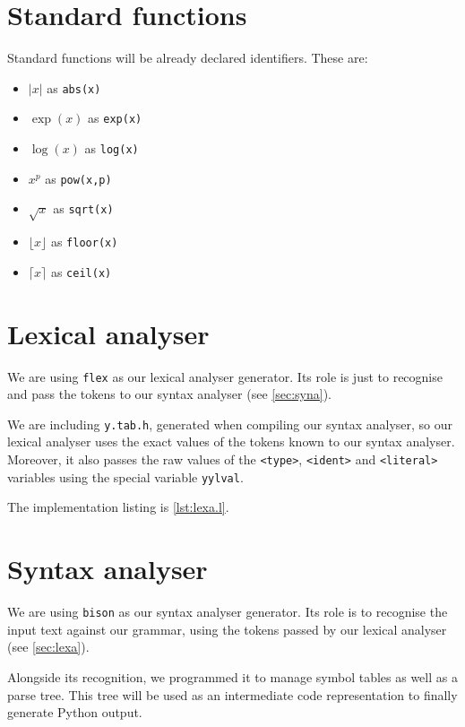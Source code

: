 \documentclass[a4paper,12pt,notitlepage,english]{article}
\begin{document}
  \section{Standard functions}\label{sec:std}

  Standard functions will be already declared identifiers.
  These are:\begin{itemize}
    \item \(|x|\) as \verb+abs(x)+
    \item \(\exp(x)\) as \verb+exp(x)+
    \item \(\log(x)\) as \verb+log(x)+
    \item \(x^p\) as \verb+pow(x,p)+
    \item \(\sqrt{x}\) as \verb+sqrt(x)+
    \item \(\lfloor x \rfloor\) as \verb+floor(x)+
    \item \(\lceil x \rceil\) as \verb+ceil(x)+
  \end{itemize}

  \section{Lexical analyser}\label{sec:lexa}

  We are using \texttt{flex} as our lexical analyser generator.
  Its role is just to recognise and pass the tokens to our syntax analyser (see \autoref{sec:syna}).

  We are including \texttt{y.tab.h}, generated when compiling our syntax analyser, so our lexical analyser uses the exact values of the tokens known to our syntax analyser.
  Moreover, it also passes the raw values of the \verb+<type>+, \verb+<ident>+ and \verb+<literal>+ variables using the special variable \texttt{yylval}.

  The implementation listing is \autoref{lst:lexa.l}.

  \section{Syntax analyser}\label{sec:syna}

  We are using \texttt{bison} as our syntax analyser generator.
  Its role is to recognise the input text against our grammar, using the tokens passed by our lexical analyser (see \autoref{sec:lexa}).

  Alongside its recognition, we programmed it to manage symbol tables as well as a parse tree.
  This tree will be used as an intermediate code representation to finally generate Python output.
\end{document}
